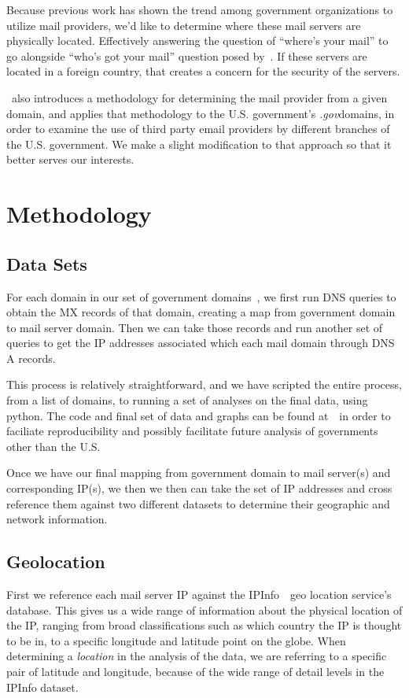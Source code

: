 \documentclass{hotnets21}
\newcommand{\dotgov}{\textit{.gov}\space}
\begin{document}
Because previous work has shown the trend among government organizations to utilize mail providers, we’d like to determine where these mail servers are physically located.
Effectively answering the question of “where’s your mail” to go alongside “who’s got your mail” question posed by~\cite{liu}.
If these servers are located in a foreign country, that creates a concern for the security of the servers.

\cite{liu}~also introduces a methodology for determining the mail provider from a given domain, and applies that methodology to the U.S. government’s \dotgov domains, in order to examine the use of third party email providers by different branches of the U.S. government.
We make a slight modification to that approach so that it better serves our interests.

\section{Methodology}

\subsection{Data Sets}
For each domain in our set of government domains~\cite{cisadomains}, we first run DNS queries to obtain the MX records of that domain, creating a map from government domain to mail server domain.
Then we can take those records and run another set of queries to get the IP addresses associated which each mail domain through DNS A records.

This process is relatively straightforward, and we have scripted the entire process, from a list of domains, to running a set of analyses on the final data, using python.
The code and final set of data and graphs can be found at~\cite{ourgithubrepo}~in order to faciliate reproducibility and possibly facilitate future analysis of governments other than the U.S.

Once we have our final mapping from government domain to mail server(s) and corresponding IP(s), we then we then can take the set of IP addresses and cross reference them against two different datasets to determine their geographic and network information.

\subsection{Geolocation}

First we reference each mail server IP against the IPInfo~\cite{ipinfo}~geo location service's database.
This gives us a wide range of information about the physical location of the IP, ranging from broad classifications such as which country the IP is thought to be in, to a specific longitude and latitude point on the globe.
When determining a \textit{location} in the analysis of the data, we are referring to a specific pair of latitude and longitude, because of the wide range of detail levels in the IPInfo dataset.
\end{document}
